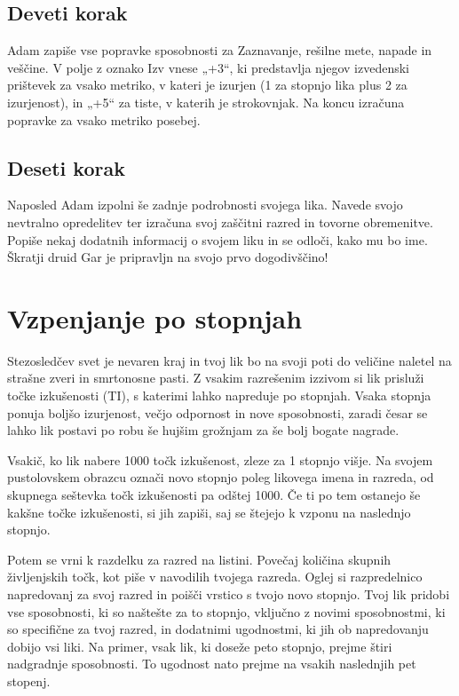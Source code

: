 \subsection{Deveti korak}
Adam zapiše vse popravke sposobnosti za Zaznavanje, rešilne mete, napade in veščine. V polje z oznako Izv vnese „+3“, ki predstavlja njegov izvedenski prištevek za vsako metriko, v kateri je izurjen (1 za stopnjo lika plus 2 za izurjenost), in „+5“ za tiste, v katerih je strokovnjak. Na koncu izračuna popravke za vsako metriko posebej.

\subsection{Deseti korak}
Naposled Adam izpolni še zadnje podrobnosti svojega lika. Navede svojo nevtralno opredelitev ter izračuna svoj zaščitni razred in tovorne obremenitve. Popiše nekaj dodatnih informacij o svojem liku in se odloči, kako mu bo ime. Škratji druid Gar je pripravljn na svojo prvo dogodivščino!

\section{Vzpenjanje po stopnjah}
Stezosledčev svet je nevaren kraj in tvoj lik bo na svoji poti do veličine naletel na strašne zveri in smrtonosne pasti. Z vsakim razrešenim izzivom si lik prisluži točke izkušenosti (TI), s katerimi lahko napreduje po stopnjah. Vsaka stopnja ponuja boljšo izurjenost, večjo odpornost in nove sposobnosti, zaradi česar se lahko lik postavi po robu še hujšim grožnjam za še bolj bogate nagrade.

Vsakič, ko lik nabere 1000 točk izkušenost, zleze za 1 stopnjo višje. Na svojem pustolovskem obrazcu označi novo stopnjo poleg likovega imena in razreda, od skupnega seštevka točk izkušenosti pa odštej 1000. Če ti po tem ostanejo še kakšne točke izkušenosti, si jih zapiši, saj se štejejo k vzponu na naslednjo stopnjo.

Potem se vrni k razdelku za razred na listini. Povečaj količina skupnih življenjskih točk, kot piše v navodilih tvojega razreda. Oglej si razpredelnico napredovanj za svoj razred in poišči vrstico s tvojo novo stopnjo. Tvoj lik pridobi vse sposobnosti, ki so naštešte za to stopnjo, vključno z novimi sposobnostmi, ki so specifične za tvoj razred, in dodatnimi ugodnostmi, ki jih ob napredovanju dobijo vsi liki. Na primer, vsak lik, ki doseže peto stopnjo, prejme štiri nadgradnje sposobnosti. To ugodnost nato prejme na vsakih naslednjih pet stopenj.

